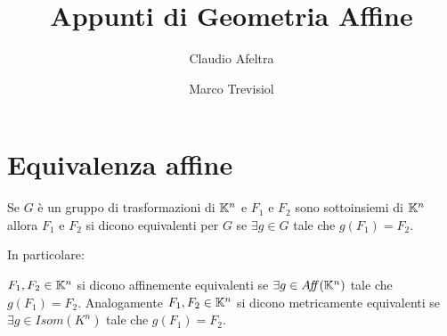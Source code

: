 \documentclass[a4paper,12pt]{article}
\title{Appunti di Geometria Affine}
\author{Claudio Afeltra \and Marco Trevisiol}
\begin{document}
\maketitle



\section{Equivalenza affine}

\begin{definition}
 Se $G$ è un gruppo di trasformazioni di $\mathbb K^n$ e $F_1$ e $F_2$ sono sottoinsiemi di $\mathbb K^n$ allora $F_1$ e $F_2$ si dicono equivalenti per 
 $G$ se $\exists g\in G$ tale che $g(F_1)=F_2$.
\end{definition}

In particolare:

\begin{definition}
$F_1,F_2\in\mathbb K^n$ si dicono affinemente equivalenti se $\exists g \in A\!f\!\!f(\mathbb K^n)$ tale che $g(F_1) = F_2 .$
Analogamente $F_1 , F_2 \in \mathbb K^n$ si dicono metricamente equivalenti se $\exists g \in I\!som(K^n)$ tale che $g(F_1) = F_2 .$
\end{definition}
\end{document}
